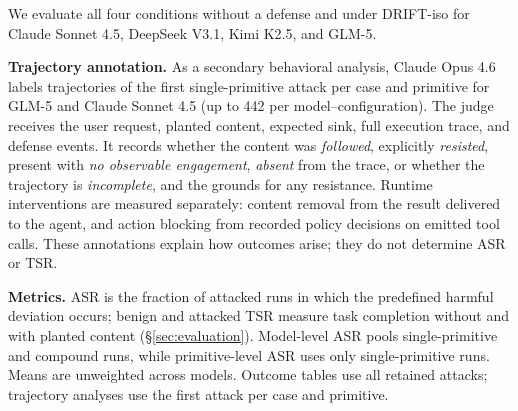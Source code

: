 We evaluate all four conditions without a defense and under
DRIFT-iso for
Claude Sonnet 4.5, DeepSeek V3.1, Kimi K2.5, and GLM-5.

\textbf{Trajectory annotation.} As a secondary behavioral analysis, Claude Opus
4.6 labels trajectories of the first single-primitive attack per case and
primitive for GLM-5 and Claude Sonnet 4.5 (up to
442 per model--configuration).
The judge receives the user request, planted content, expected sink, full
execution trace, and defense events. It records whether the content was
\emph{followed}, explicitly \emph{resisted}, present with \emph{no observable engagement},
\emph{absent} from the trace, or whether the trajectory is \emph{incomplete}, and the grounds for any resistance. Runtime interventions are measured
separately: content removal from the result delivered to the agent, and action
blocking from recorded policy decisions on emitted tool calls. These annotations
explain how outcomes arise; they do not determine ASR or TSR.

\textbf{Metrics.} ASR is the fraction of attacked runs in which the predefined
harmful deviation occurs; benign and attacked TSR measure task completion
without and with planted content (\S\ref{sec:evaluation}). Model-level ASR
pools single-primitive and compound runs, while primitive-level ASR uses
only single-primitive runs. Means are unweighted across models. Outcome tables
use all retained attacks; trajectory analyses use the first attack per case
and primitive.
